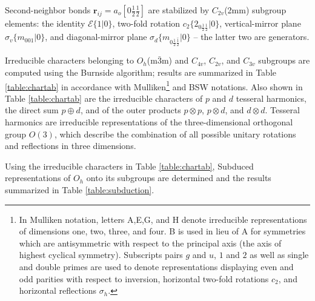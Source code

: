\documentclass[twocolumn,showpacs,preprintnumbers,superscriptaddress,prb,floatfix,aps,10pt]{revtex4-1}
\renewcommand{\vec}[1]{\ensuremath{\mathbf{#1}}}
\newcommand*{\id}{\mathcal{E}}
\newcommand*{\bondvec}{\vec{r}_{ij}}
\newcommand{\seitz}[2]{\{#1|#2\}}
\begin{document}
Second-neighbor bonds $\bondvec = a_o[0\frac{1}{2}\frac{1}{2}]$ are stabilized by $C_{2v}$(2mm) subgroup elements: the identity $\id \seitz{1}{0}$, two-fold rotation $c_2 \seitz{ 2_{0\frac{1}{2}\frac{1}{2}} }{0}$, vertical-mirror plane $\sigma_v \seitz{m_{001}}{0}$, and diagonal-mirror plane $\sigma_d \seitz{m_{0\frac{1}{2}\bar{\frac{1}{2}}}}{0}$ -- the latter two are generators.


Irreducible characters belonging to $O_h$(m$\bar{3}$m) and $C_{4v}$, $C_{2v}$, and $C_{3v}$ subgroups are computed using the Burnside algorithm; results are summarized in Table \ref{table:chartab} in accordance with Mulliken\footnote{In Mulliken notation, letters A,E,G, and H denote irreducible representations of dimensions one, two, three, and four. B is used in lieu of A for symmetries which are antisymmetric with respect to the principal axis (the axis of highest cyclical symmetry). Subscripts pairs $g$ and $u$, $1$ and $2$ as well as single and double primes are used to denote representations displaying even and odd parities with respect to inversion, horizontal two-fold rotations $c_2$, and horizontal reflections $\sigma_h$.} and BSW notations. Also shown in Table \ref{table:chartab} are the irreducible characters of $p$ and $d$ tesseral harmonics, the direct sum $p \oplus d$, and of the outer products $p \otimes p$, $p \otimes d$, and $d \otimes d$. Tesseral harmonics are irreducible representations of the three-dimensional orthogonal group $O(3)$, which describe the combination of all possible unitary rotations and reflections in three dimensions. 

Using the irreducible characters in Table \ref{table:chartab}, Subduced representations of $O_h$ onto its subgroups are determined and the results summarized in Table \ref{table:subduction}. 
\end{document}
